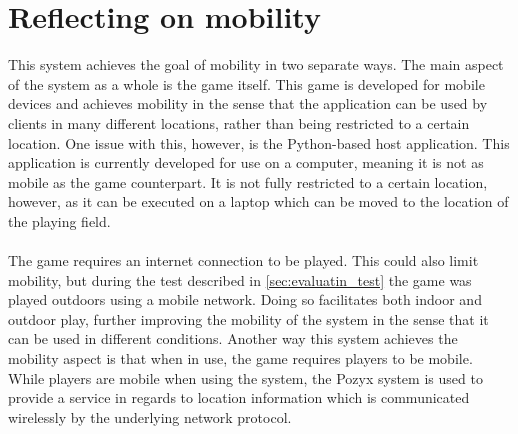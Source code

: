 \section{Reflecting on mobility}
This system achieves the goal of mobility in two separate ways.
The main aspect of the system as a whole is the game itself.
This game is developed for mobile devices and achieves mobility in the sense that the application can be used by clients in many different locations, rather than being restricted to a certain location.
One issue with this, however, is the Python-based host application.
This application is currently developed for use on a computer, meaning it is not as mobile as the game counterpart.
It is not fully restricted to a certain location, however, as it can be executed on a laptop which can be moved to the location of the playing field.
\\\\
The game requires an internet connection to be played.
This could also limit mobility, but during the test described in \autoref{sec:evaluatin_test} the game was played outdoors using a mobile network.
Doing so facilitates both indoor and outdoor play, further improving the mobility of the system in the sense that it can be used in different conditions.
Another way this system achieves the mobility aspect is that when in use, the game requires players to be mobile.
While players are mobile when using the system, the Pozyx system is used to provide a service in regards to location information which is communicated wirelessly by the underlying network protocol.
